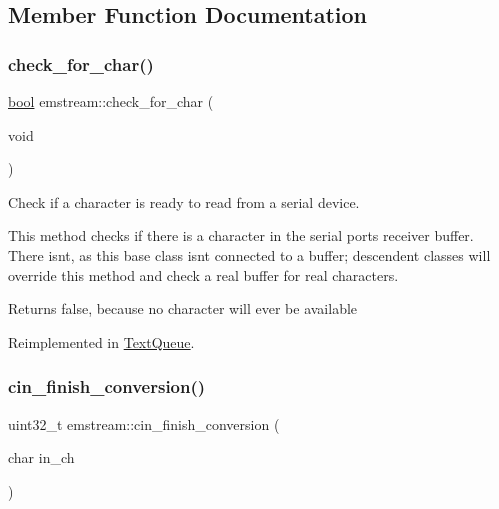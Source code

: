 \subsection{Member Function Documentation}
\mbox{\label{classemstream_a64494c4283e4750d29d93df245045d56}} 
\subsubsection{\texorpdfstring{check\+\_\+for\+\_\+char()}{check\_for\_char()}}
{\footnotesize\ttfamily \mbox{\hyperlink{group___motor___boolean___type_ga0ecf26b576b9a54eca656b9be7ba6a06}{bool}} emstream\+::check\+\_\+for\+\_\+char (\begin{DoxyParamCaption}\item[{void}]{ }\end{DoxyParamCaption})\hspace{0.3cm}{\ttfamily [virtual]}}



Check if a character is ready to read from a serial device. 

This method checks if there is a character in the serial port\textquotesingle{}s receiver buffer. There isn\textquotesingle{}t, as this base class isn\textquotesingle{}t connected to a buffer; descendent classes will override this method and check a real buffer for real characters. \begin{DoxyReturn}{Returns}
{\ttfamily false}, because no character will ever be available 
\end{DoxyReturn}


Reimplemented in \mbox{\hyperlink{class_text_queue_a4b520515f1110e8d592a3b5a5abc615b}{Text\+Queue}}.

\mbox{\label{classemstream_a38238da76568289a5f510c2fcbea4121}} 
\subsubsection{\texorpdfstring{cin\+\_\+finish\+\_\+conversion()}{cin\_finish\_conversion()}}
{\footnotesize\ttfamily uint32\+\_\+t emstream\+::cin\+\_\+finish\+\_\+conversion (\begin{DoxyParamCaption}\item[{char}]{in\+\_\+ch }\end{DoxyParamCaption})\hspace{0.3cm}{\ttfamily [protected]}}



